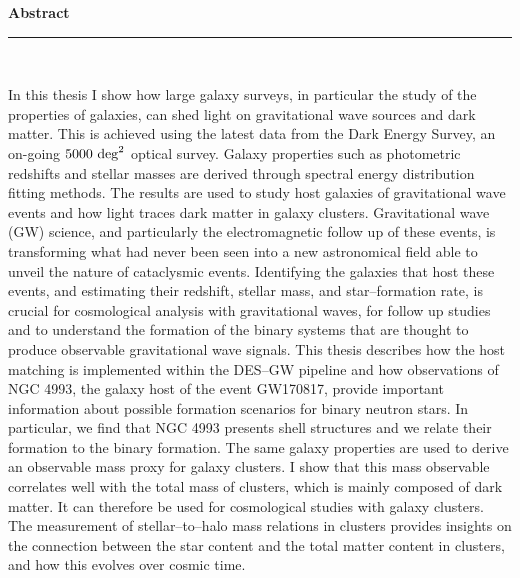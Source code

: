 \thispagestyle{empty}
\begin{raggedleft}
\vspace*{23mm}
\hfill {\huge {\bf {Abstract}}} \\
\vspace{6mm}
\hfill \rule{4in}{.015in} \\
\vspace{19mm}
\end{raggedleft}

\noindent{ }

In this thesis I show how large galaxy surveys, in particular the study of the properties of galaxies, can shed light on gravitational wave sources and dark matter. This is achieved using the latest data from the Dark Energy Survey, an on-going $5000 ~{\rm deg}^2$ optical survey. Galaxy properties such as photometric redshifts and stellar masses are derived through spectral energy distribution fitting methods. The results are used to study host galaxies of gravitational wave events and how light traces dark matter in galaxy clusters.
Gravitational wave (GW) science, and particularly the electromagnetic follow up of these events, is transforming what had never been seen into a new astronomical field able to unveil the nature of cataclysmic events. Identifying the galaxies that host these events, and estimating their redshift, stellar mass, and star--formation rate, is crucial for cosmological analysis with gravitational waves, for follow up studies and to understand the formation of the binary systems that are thought to produce observable gravitational wave signals. This thesis describes how the host matching is implemented within the DES--GW pipeline and how observations of NGC 4993, the galaxy host of the event GW170817, provide important information about possible formation scenarios for binary neutron stars. In particular, we find that NGC 4993 presents shell structures and we relate their formation to the binary formation.
The same galaxy properties are used to derive an observable mass proxy for galaxy clusters. I show that this mass observable correlates well with the total mass of clusters, which is mainly composed of dark matter. It can therefore be used for cosmological studies with galaxy clusters. The measurement of stellar--to--halo mass relations in clusters provides insights on the connection between the star content and the total matter content in clusters, and how this evolves over cosmic time.


